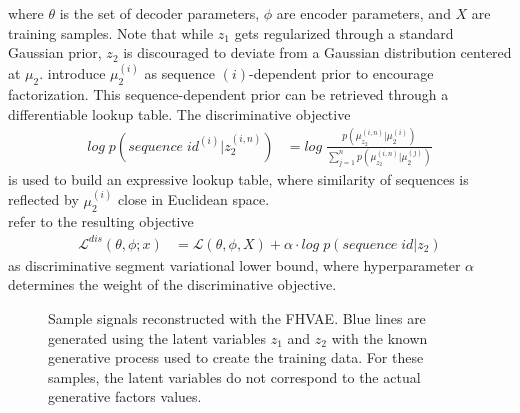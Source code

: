 \documentclass{article} %
\begin{document}
where $\theta$ is the set of decoder parameters, $\phi$ are encoder parameters, and $X$ are training samples. Note that while $z_1$ gets regularized through a standard Gaussian prior, $z_2$ is discouraged to deviate from a Gaussian distribution centered at $\mu_2$. \citet{hsu2017unsupervised} introduce $\mu_{2}^{(i)}$ as sequence $(i)$-dependent prior to encourage factorization. This sequence-dependent prior can be retrieved through a differentiable lookup table. The discriminative objective 
\begin{align*}
log\;p(sequence\;id^{(i)} | z_2^{(i,n)})& = log\;\frac{p(\mu_{z_2}^{(i,n)}|\mu_2^{(i)})}{\sum^{n}_{j=1}	p(\mu_{z_2}^{(i,n)}|\mu_2^{(j)})}
\end{align*}
is used to build an expressive lookup table, where similarity of sequences is reflected by $\mu_{2}^{(i)}$ close in Euclidean space.\\
\citet{hsu2017unsupervised} refer to the resulting objective
\begin{align*}
\mathcal{L}^{dis}(\theta, \phi;x)& = \mathcal{L}(\theta, \phi, X) + \alpha \cdot log\;p(sequence\;id | z_2)
\end{align*}
as discriminative segment variational lower bound, where hyperparameter $\alpha$ determines the weight of the discriminative objective.



\begin{figure}[t]\scriptsize
	\centering
	\caption{Sample signals reconstructed with the FHVAE. Blue lines are generated using the latent variables $z_1$ and $z_2$ with the known generative process used to create the training data. For these samples, the latent variables do not correspond to the actual generative factors values.}
	\label{fig:samples}
\end{figure}
\end{document}
